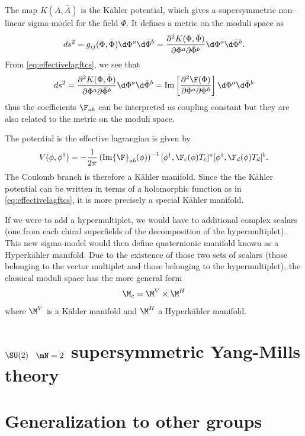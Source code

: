 \documentclass{worksheetclass}
\begin{document}
        The map $K(A,\bar{A})$ is the Kähler potential, which gives a supersymmetric non-linear sigma-model for the field $\Phi$. It defines a metric on the moduli space as
        \begin{equation}
            ds^2=g_{i\bar{j}}(\Phi,\bar{\Phi})\d\Phi^a\d\bar{\Phi}^b = \pdv{K(\Phi,\bar{\Phi})}{\Phi^a}{\bar{\Phi}^b}\d\Phi^a\d\bar{\Phi}^b.
        \end{equation}
        From \eqref{eq:effectivelagftcs}, we see that 
        \begin{equation}
            ds^2=\pdv{K(\Phi,\bar{\Phi})}{\Phi^a}{\bar{\Phi}^b}\d\Phi^a\d\bar{\Phi}^b = \Im\left[\pdv{\F(\Phi)}{\Phi^a}{\Phi^b}\right]\d\Phi^a\d\bar{\Phi}^b
        \end{equation}
        thus the coefficients $\F_{ab}$ can be interpreted as coupling constant but they are also related to the metric on the moduli space.

        The potential is the effective lagrangian is given by
        \begin{equation}
            V(\phi,\phi^\dagger)=-\frac{1}{2\pi}\left(\Im\F_{ab}(\phi)\right)^{-1}[\phi^\dagger,\F_c(\phi)T_c]^a[\phi^\dagger,\F_d(\phi)T_d]^b.
        \end{equation}
        The Coulomb branch is therefore a Kähler manifold. Since the the Kähler potential can be written in terms of a holomorphic function as in \eqref{eq:effectivelagftcs}, it is more precisely a special Kähler manifold.

        If we were to add a hypermultiplet, we would have to additional complex scalars (one from each chiral superfields of the decomposition of the hypermultiplet). This new sigma-model would then define quaternionic manifold known as a Hyperkähler manifold. Due to the existence of those two sets of scalars (those belonging to the vector multiplet and those belonging to the hypermultiplet), the classical moduli space has the more general form
        \begin{equation}
            \M_c=\M^V\times\M^H
        \end{equation}
        where $\M^V$ is a Kähler manifold and $\M^H$ a Hyperkähler manifold.


\section{$\SU(2)$ $\mN=2$ supersymmetric Yang-Mills theory}

\section{Generalization to other groups}
\end{document}
